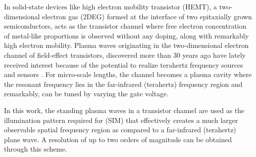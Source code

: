 \documentclass[11pt]{article}
\begin{document}
In solid-state devices like high electron mobility transistor (HEMT), a two-dimensional electron gas (2DEG) formed at the interface of two epitaxially grown semiconductors, acts as the transistor channel where free electron concentration of metal-like proportions is observed without any doping, along with remarkably high electron mobility. Plasma waves originating in the two-dimensional electron channel of field-effect transistors, discovered more than 30 years ago have lately received interest because of the potential to realize terahertz frequency sources and sensors \cite{Dyakonov_1993,Dyakonov_1996,Popov_2008,Otsuji_2006,Muravjov_2010}. For micro-scale lengths, the channel becomes a plasma cavity where the resonant frequency lies in the far-infrared (terahertz) frequency region and remarkably, can be tuned by varying the gate voltage.

In this work, the standing plasma waves in a transistor channel are used as the illumination pattern required for (SIM) that effectively creates a much larger observable spatial frequency region as compared to a far-infrared (terahertz) plane wave. A resolution of up to two orders of magnitude can be obtained through this scheme.

\end{document}

